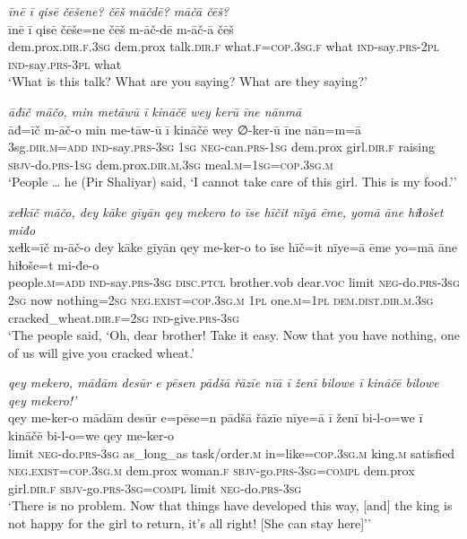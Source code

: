 \ea \label{ŽP.223}
\textit{īnē ī qisē čēšene? čēš māčdē? māčā čēš?} \\ 
\gll īnē ī qisē čēše=ne čēš m-āč-dē m-āč-ā čēš \\ 
 dem.prox\textsc{.dir}\textsc{.f}\textsc{.3sg} dem.prox talk\textsc{.dir}\textsc{.f} what\textsc{.f}\textsc{=cop}\textsc{.3sg}\textsc{.f} what \textsc{ind-}say\textsc{.prs}-\textsc{2pl} \textsc{ind-}say\textsc{.prs}\textsc{-3pl} what \\ 
\glt `What is this talk? What are you saying? What are they saying?'
\z 
 
\ea \label{ŽP.226}
\textit{āđīč māčo, min metāwū ī kināčē wey kerū īne nānmā} \\ 
\gll āđ=īč m-āč-o min me-tāw-ū ī kināčē wey ∅-ker-ū īne nān=m=ā \\ 
 3sg\textsc{.dir}\textsc{.m}\textsc{=add} \textsc{ind-}say\textsc{.prs}\textsc{-3sg} \textsc{1sg} \textsc{neg-}can\textsc{.prs}\textsc{-\textsc{1sg}} dem.prox girl\textsc{.dir}\textsc{.f} raising \textsc{sbjv-}do\textsc{.prs}\textsc{-\textsc{1sg}} dem.prox\textsc{.dir}\textsc{.m}\textsc{.3sg} meal\textsc{.m}\textsc{=\textsc{1sg}}\textsc{=cop}\textsc{.3sg}\textsc{.m} \\ 
\glt `People … he (Pir Shaliyar) said, ‘I cannot take care of this girl. This is my food.’'
\z 
 
\ea \label{ŽP.227}
\textit{xeɫkīč māčo, dey kāke gīyān qey mekero to īse hīčit nīyā ēme, yomā āne hiɫošet miđo} \\ 
\gll xeɫk=īč m-āč-o dey kāke gīyān qey me-ker-o to īse hīč=it nīye=ā ēme yo=mā āne hiɫoše=t mi-đe-o \\ 
 people\textsc{.m}\textsc{=add} \textsc{ind-}say\textsc{.prs}\textsc{-3sg} \textsc{disc.ptcl} brother.vob dear.\textsc{voc} limit \textsc{neg-}do\textsc{.prs}\textsc{-3sg} \textsc{2sg} now nothing\textsc{=\textsc{2sg}} \textsc{\textsc{neg.}exist}\textsc{=cop}\textsc{.3sg}\textsc{.m} \textsc{1pl} one\textsc{.m}\textsc{=1pl} \textsc{dem.dist}\textsc{.dir}\textsc{.m}\textsc{.3sg} cracked\_wheat\textsc{.dir}\textsc{.f}\textsc{=\textsc{2sg}} \textsc{ind-}give\textsc{.prs}\textsc{-3sg} \\ 
\glt `The people said, ‘Oh, dear brother! Take it easy. Now that you have nothing, one of us will give you cracked wheat.'
\z 
 
\ea \label{ŽP.242}
\textit{qey mekero, mādām desūr e pēsen pādšā řāzīe nīā ī ženī bilowe ī kināčē bilowe qey mekero!’} \\ 
\gll qey me-ker-o mādām desūr e=pēse=n pādšā řāzīe nīye=ā ī ženī bi-l-o=we ī kināčē bi-l-o=we qey me-ker-o \\ 
 limit \textsc{neg-}do\textsc{.prs}\textsc{-3sg} as\_long\_as task/order\textsc{.m} in=like\textsc{=cop}\textsc{.3sg}\textsc{.m} king\textsc{.m} satisfied \textsc{\textsc{neg.}exist}\textsc{=cop}\textsc{.3sg}\textsc{.m} dem.prox woman\textsc{.f} \textsc{sbjv-}go\textsc{.prs}\textsc{-3sg}\textsc{=compl} dem.prox girl\textsc{.dir}\textsc{.f} \textsc{sbjv-}go\textsc{.prs}\textsc{-3sg}\textsc{=compl} limit \textsc{neg-}do\textsc{.prs}\textsc{-3sg} \\ 
\glt `There is no problem. Now that things have developed this way, [and] the king is not happy for the girl to return, it’s all right! [She can stay here]’'
\z 
 
